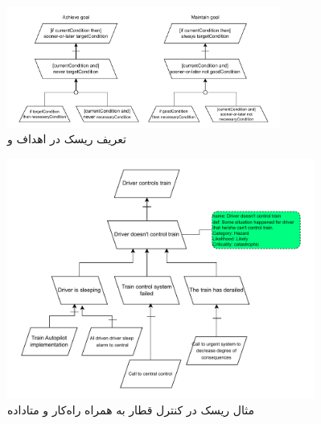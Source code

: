 \begin{figure}[H]
    \centering
    \includegraphics[width=0.8\textwidth]{assets/achieve_maintain_goal.drawio.pdf}
    \caption{تعریف ریسک در اهداف  و }
\end{figure}

\begin{figure}[H]
    \centering
    \includegraphics[width=0.9\textwidth]{assets/train_control_risk.drawio.pdf}
    \caption{مثال ریسک در کنترل قطار به همراه راه‌کار و متاداده}
\end{figure}